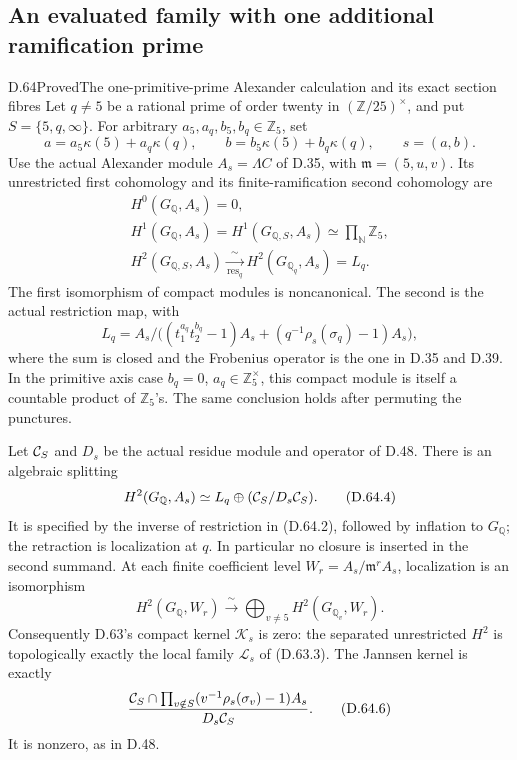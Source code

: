 \subsection{An evaluated family with one additional ramification prime}

\begin{statement}{D.64}{Proved}{The one-primitive-prime Alexander calculation and its exact section fibres}
Let \(q\ne5\) be a rational prime of order twenty in
\((\mathbb Z/25)^\times\), and put \(S=\{5,q,\infty\}\).
For arbitrary \(a_5,a_q,b_5,b_q\in\mathbb Z_5\), set
\[
 a=a_5\kappa(5)+a_q\kappa(q),\qquad
 b=b_5\kappa(5)+b_q\kappa(q),\qquad s=(a,b).
                                                        \tag{D.64.1}
\]
Use the actual Alexander module \(A_s=\Lambda C\) of D.35,
with \(\mathfrak m=(5,u,v)\). Its unrestricted first
cohomology and its finite-ramification second cohomology are
\[
 \begin{gathered}
 H^0(G_{\mathbb Q},A_s)=0,\\
 H^1(G_{\mathbb Q},A_s)=H^1(G_{\mathbb Q,S},A_s)
                   \simeq\prod_{\mathbb N}\mathbb Z_5,\\
 H^2(G_{\mathbb Q,S},A_s)
       \xrightarrow[\mathrm{res}_q]{\ \sim\ }
 H^2(G_{\mathbb Q_q},A_s)=L_q.
 \end{gathered}                                         \tag{D.64.2}
\]
The first isomorphism of compact modules is noncanonical.
The second is the actual restriction map, with
\[
 L_q=A_s/\bigl((t_1^{a_q}t_2^{b_q}-1)A_s+
                    (q^{-1}\rho_s(\sigma_q)-1)A_s\bigr),
                                                        \tag{D.64.3}
\]
where the sum is closed and the Frobenius operator is
the one in D.35 and D.39. In the primitive axis case
\(b_q=0\), \(a_q\in\mathbb Z_5^\times\), this compact
module is itself a countable product of \(\mathbb Z_5\)'s.
The same conclusion holds after permuting the punctures.

Let \({\cal C}_S\) and \(D_s\) be the actual residue
module and operator of D.48. There is an algebraic splitting
\[
 H^2(G_{\mathbb Q},A_s)
       \simeq L_q\oplus({\cal C}_S/D_s{\cal C}_S).
                                                        \tag{D.64.4}
\]
It is specified by the inverse of restriction in (D.64.2),
followed by inflation to \(G_{\mathbb Q}\); the retraction
is localization at \(q\). In particular no closure is
inserted in the second summand. At each finite coefficient
level \(W_r=A_s/\mathfrak m^rA_s\), localization is an
isomorphism
\[
 H^2(G_{\mathbb Q},W_r)
       \xrightarrow{\ \sim\ }
            \bigoplus_{v\ne5}H^2(G_{\mathbb Q_v},W_r).
                                                        \tag{D.64.5}
\]
Consequently D.63's compact kernel \(\mathcal K_s\) is zero:
the separated unrestricted \(H^2\) is topologically exactly
the local family \(\mathcal L_s\) of (D.63.3). The Jannsen
kernel is exactly
\[
 \frac{{\cal C}_S\cap
             \prod_{v\notin S}(v^{-1}\rho_s(\sigma_v)-1)A_s}
      {D_s{\cal C}_S}.
                                                        \tag{D.64.6}
\]
It is nonzero, as in D.48.


\end{statement}
